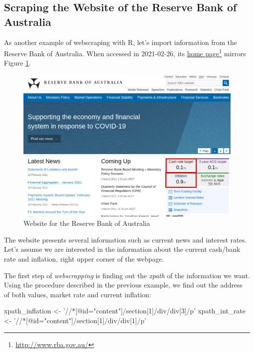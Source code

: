 \documentclass[
  12pt,
]{book}
\newenvironment{Shaded}{\begin{snugshade}}{\end{snugshade}}
\newcommand{\NormalTok}[1]{#1}
\newcommand{\StringTok}[1]{\textcolor[rgb]{0.5,0.5,0.5}{#1}}
\begin{document}
\hypertarget{scraping-the-website-of-the-reserve-bank-of-australia}{%
\subsection{Scraping the Website of the Reserve Bank of Australia}\label{scraping-the-website-of-the-reserve-bank-of-australia}}

As another example of webscraping with R, let's import information from the Reserve Bank of Australia. When accessed in 2021-02-26, its \href{http://www.rba.gov.au/}{home page}\footnote{\url{http://www.rba.gov.au/}} mirrors Figure \ref{fig:RBA-website}.

\begin{figure}[!htbp]

{\centering \includegraphics[width=0.75\linewidth]{figs/website_RBA-webscrapping} 

}

\caption{Website for the Reserve Bank of Australia}\label{fig:RBA-website}
\end{figure}

The website presents several information such as current news and interest rates. Let's assume we are interested in the information about the current cash/bank rate and inflation, right upper corner of the webpage.

The first step of \emph{webscrapping} is finding out the \emph{xpath} of the information we want. Using the procedure described in the previous example, we find out the address of both values, market rate and current inflation:

\begin{Shaded}
\begin{Highlighting}[]
\NormalTok{xpath_inflation <-}\StringTok{ '//*[@id="content"]/section[1]/div/div[3]/p'}
\NormalTok{xpath_int_rate <-}\StringTok{ '//*[@id="content"]/section[1]/div/div[1]/p'}
\end{Highlighting}
\end{Shaded}
\end{document}
